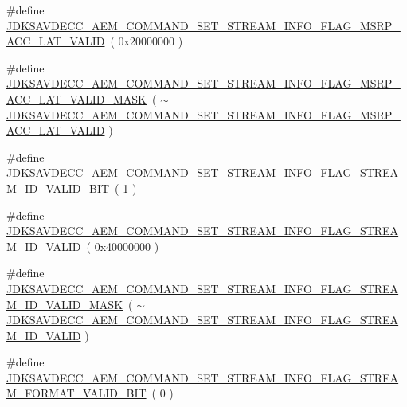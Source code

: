 \begin{DoxyCompactItemize}
\item 
\#define \hyperlink{group__command__set__stream__info_ga7c2f2c6368e7392cb42642a18f3ac9b1}{J\+D\+K\+S\+A\+V\+D\+E\+C\+C\+\_\+\+A\+E\+M\+\_\+\+C\+O\+M\+M\+A\+N\+D\+\_\+\+S\+E\+T\+\_\+\+S\+T\+R\+E\+A\+M\+\_\+\+I\+N\+F\+O\+\_\+\+F\+L\+A\+G\+\_\+\+M\+S\+R\+P\+\_\+\+A\+C\+C\+\_\+\+L\+A\+T\+\_\+\+V\+A\+L\+ID}~( 0x20000000 )
\item 
\#define \hyperlink{group__command__set__stream__info_ga6ec86326ff0a255b4ab8373083acb5d0}{J\+D\+K\+S\+A\+V\+D\+E\+C\+C\+\_\+\+A\+E\+M\+\_\+\+C\+O\+M\+M\+A\+N\+D\+\_\+\+S\+E\+T\+\_\+\+S\+T\+R\+E\+A\+M\+\_\+\+I\+N\+F\+O\+\_\+\+F\+L\+A\+G\+\_\+\+M\+S\+R\+P\+\_\+\+A\+C\+C\+\_\+\+L\+A\+T\+\_\+\+V\+A\+L\+I\+D\+\_\+\+M\+A\+SK}~( $\sim$\hyperlink{group__command__set__stream__info_ga7c2f2c6368e7392cb42642a18f3ac9b1}{J\+D\+K\+S\+A\+V\+D\+E\+C\+C\+\_\+\+A\+E\+M\+\_\+\+C\+O\+M\+M\+A\+N\+D\+\_\+\+S\+E\+T\+\_\+\+S\+T\+R\+E\+A\+M\+\_\+\+I\+N\+F\+O\+\_\+\+F\+L\+A\+G\+\_\+\+M\+S\+R\+P\+\_\+\+A\+C\+C\+\_\+\+L\+A\+T\+\_\+\+V\+A\+L\+ID} )
\item 
\#define \hyperlink{group__command__set__stream__info_ga143e2108647cc2c1b02a5f77fd31c6db}{J\+D\+K\+S\+A\+V\+D\+E\+C\+C\+\_\+\+A\+E\+M\+\_\+\+C\+O\+M\+M\+A\+N\+D\+\_\+\+S\+E\+T\+\_\+\+S\+T\+R\+E\+A\+M\+\_\+\+I\+N\+F\+O\+\_\+\+F\+L\+A\+G\+\_\+\+S\+T\+R\+E\+A\+M\+\_\+\+I\+D\+\_\+\+V\+A\+L\+I\+D\+\_\+\+B\+IT}~( 1 )
\item 
\#define \hyperlink{group__command__set__stream__info_gae059f565078fc21696db193fc30ff3c2}{J\+D\+K\+S\+A\+V\+D\+E\+C\+C\+\_\+\+A\+E\+M\+\_\+\+C\+O\+M\+M\+A\+N\+D\+\_\+\+S\+E\+T\+\_\+\+S\+T\+R\+E\+A\+M\+\_\+\+I\+N\+F\+O\+\_\+\+F\+L\+A\+G\+\_\+\+S\+T\+R\+E\+A\+M\+\_\+\+I\+D\+\_\+\+V\+A\+L\+ID}~( 0x40000000 )
\item 
\#define \hyperlink{group__command__set__stream__info_gaffe8038c9f89be58b7ac171b58b3a5de}{J\+D\+K\+S\+A\+V\+D\+E\+C\+C\+\_\+\+A\+E\+M\+\_\+\+C\+O\+M\+M\+A\+N\+D\+\_\+\+S\+E\+T\+\_\+\+S\+T\+R\+E\+A\+M\+\_\+\+I\+N\+F\+O\+\_\+\+F\+L\+A\+G\+\_\+\+S\+T\+R\+E\+A\+M\+\_\+\+I\+D\+\_\+\+V\+A\+L\+I\+D\+\_\+\+M\+A\+SK}~( $\sim$\hyperlink{group__command__set__stream__info_gae059f565078fc21696db193fc30ff3c2}{J\+D\+K\+S\+A\+V\+D\+E\+C\+C\+\_\+\+A\+E\+M\+\_\+\+C\+O\+M\+M\+A\+N\+D\+\_\+\+S\+E\+T\+\_\+\+S\+T\+R\+E\+A\+M\+\_\+\+I\+N\+F\+O\+\_\+\+F\+L\+A\+G\+\_\+\+S\+T\+R\+E\+A\+M\+\_\+\+I\+D\+\_\+\+V\+A\+L\+ID} )
\item 
\#define \hyperlink{group__command__set__stream__info_gae670bc2bebed10307558e730ba78f7f6}{J\+D\+K\+S\+A\+V\+D\+E\+C\+C\+\_\+\+A\+E\+M\+\_\+\+C\+O\+M\+M\+A\+N\+D\+\_\+\+S\+E\+T\+\_\+\+S\+T\+R\+E\+A\+M\+\_\+\+I\+N\+F\+O\+\_\+\+F\+L\+A\+G\+\_\+\+S\+T\+R\+E\+A\+M\+\_\+\+F\+O\+R\+M\+A\+T\+\_\+\+V\+A\+L\+I\+D\+\_\+\+B\+IT}~( 0 )

\end{DoxyCompactItemize}
